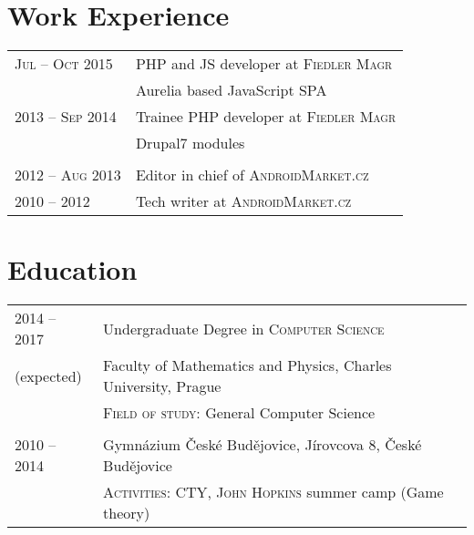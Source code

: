 \documentclass[a4paper,10pt]{article}
\newcommand{\rightcol}{11.2cm}
\newcommand{\leftcol}{2.8cm}
\begin{document}
\section{Work Experience}
\begin{tabular}{p{\leftcol}|p{\rightcol}}
\textsc{Jul -- Oct 2015} & PHP and JS developer at \textsc{Fiedler Magr}\\
                    & \footnotesize{Aurelia based JavaScript SPA}\\
\textsc{2013 -- Sep 2014} & Trainee PHP developer at \textsc{Fiedler Magr}\\
                    & \footnotesize{Drupal7 modules}\\

\multicolumn{2}{c}{} \\                    
                    
\textsc{2012 -- Aug 2013} & Editor in chief of \textsc{AndroidMarket.cz}\\
\textsc{2010 -- 2012} & Tech writer at \textsc{AndroidMarket.cz}\\
\end{tabular}

\section{Education}
\begin{tabular}{p{\leftcol}|p{\rightcol}}
\textsc{2014 -- 2017} & Undergraduate Degree in \textsc{Computer Science}\\
{\footnotesize (expected)} &\normalsize{Faculty of Mathematics and Physics}, {Charles University}, Prague\\
                & \footnotesize{\textsc{Field of study:} {General Computer Science}}\\
\multicolumn{2}{c}{}\\
\textsc{2010 -- 2014} & {Gymnázium České Budějovice}, Jírovcova 8, České Budějovice\\
                & \footnotesize{\textsc{Activities:} \textsc{CTY, John Hopkins} summer camp (Game theory)}\\
                
\end{tabular}

\end{document}
